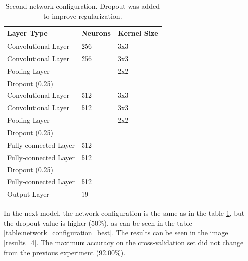 \documentclass[journal]{IEEEtran}
\begin{document}
\begin{table}[]
\centering
\caption{Second network configuration. Dropout was added to improve regularization.}
\label{table:network_configuration_second}
\begin{tabular}{|l|l|l|}
\hline
\textbf{Layer Type}   & \textbf{Neurons} & \textbf{Kernel Size} \\ \hline
Convolutional Layer   & 256              & 3x3                  \\ \hline
Convolutional Layer   & 256              & 3x3                  \\ \hline
Pooling Layer         &                  & 2x2                  \\ \hline
Dropout (0.25)        &                  &                      \\ \hline
Convolutional Layer   & 512              & 3x3                  \\ \hline
Convolutional Layer   & 512              & 3x3                  \\ \hline
Pooling Layer         &                  & 2x2                  \\ \hline
Dropout (0.25)        &                  &                      \\ \hline
Fully-connected Layer & 512              &                      \\ \hline
Fully-connected Layer & 512              &                      \\ \hline
Dropout (0.25)        &                  &                      \\ \hline
Fully-connected Layer & 512              &                      \\ \hline
Output Layer          & 19               &                      \\ \hline
\end{tabular}
\end{table}

In the next model, the network configuration is the same as in the table \ref{table:network_configuration_second}, but the dropout value is higher (50\%), as can be seen in the table \ref{table:network_configuration_best}. The results can be seen in the image \ref{results_4}. The maximum accuracy on the cross-validation set did not change from the previous experiment (92.00\%).
\end{document}
